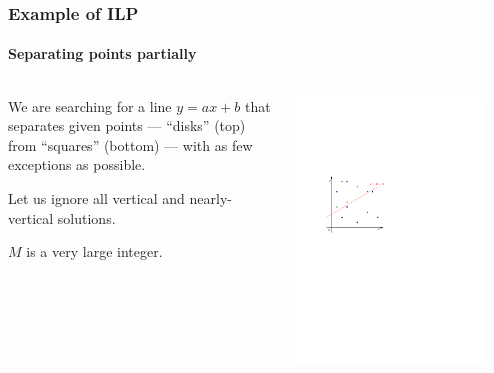\documentclass{beamer}
\renewcommand{\.}{\hskip .75pt}
\begin{document}
\begin{frame}
	\frametitle{Example of ILP}
	\framesubtitle{Separating points partially}
	
	\begin{columns}
		\begin{column}{0.5\textwidth}
			We are searching for a line $y = ax + b$ that separates given points --- \textcolor{dgreen}{``disks'' (top)} from \textcolor{dblue}{``squares'' (bottom)} --- with as few exceptions as possible.
			\medskip
			
			Let us ignore all vertical and nearly-vertical solutions.
			\medskip
			
			$M$ is a very large integer.
		\end{column}
	
		\begin{column}{0.5\textwidth}
			\begin{center}
				\includegraphics[width=0.88\textwidth]{separating_p}
			\end{center}
		\end{column}
	\end{columns}


\end{frame}
\end{document}
